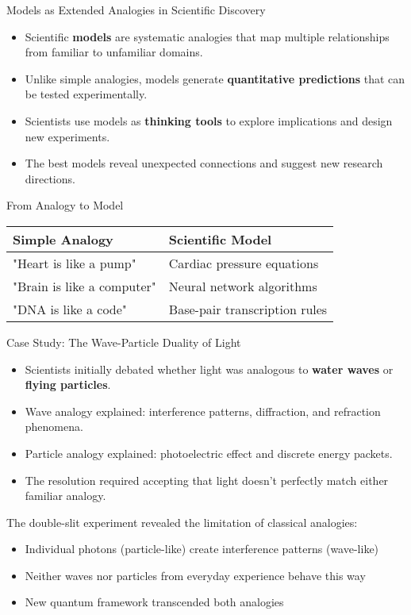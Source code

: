 \documentclass{beamer}
\begin{document}
	
	\begin{frame}{Models as Extended Analogies in Scientific Discovery}
		\begin{itemize}
			\item Scientific \textbf{models} are systematic analogies that map multiple relationships from familiar to unfamiliar domains.
			\item Unlike simple analogies, models generate \textbf{quantitative predictions} that can be tested experimentally.
			\item Scientists use models as \textbf{thinking tools} to explore implications and design new experiments.
			\item The best models reveal unexpected connections and suggest new research directions.
		\end{itemize}
		
		\begin{block}{From Analogy to Model}
			\begin{tabular}{l|l}
				\textbf{Simple Analogy} & \textbf{Scientific Model} \\
				\hline
				"Heart is like a pump" & Cardiac pressure equations \\
				"Brain is like a computer" & Neural network algorithms \\
				"DNA is like a code" & Base-pair transcription rules
			\end{tabular}
		\end{block}
	\end{frame}
	
	\begin{frame}{Case Study: The Wave-Particle Duality of Light}
		\begin{itemize}
			\item Scientists initially debated whether light was analogous to \textbf{water waves} or \textbf{flying particles}.
			\item Wave analogy explained: interference patterns, diffraction, and refraction phenomena.
			\item Particle analogy explained: photoelectric effect and discrete energy packets.
			\item The resolution required accepting that light doesn't perfectly match either familiar analogy.
		\end{itemize}
		
		\begin{example}
			The double-slit experiment revealed the limitation of classical analogies:
			\begin{itemize}
				\item Individual photons (particle-like) create interference patterns (wave-like)
				\item Neither waves nor particles from everyday experience behave this way
				\item New quantum framework transcended both analogies
			\end{itemize}
		\end{example}
	\end{frame}
	
\end{document}
